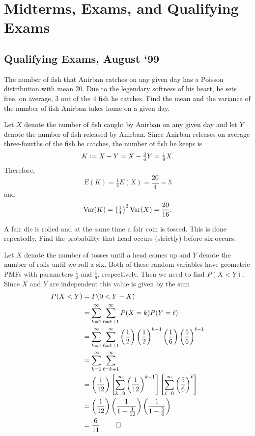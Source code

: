 \section{Midterms, Exams, and Qualifying Exams}
\subsection{Qualifying Exams, August `99}
\begin{problem}
  The number of fish that Anirban catches on any given day has a Poisson
  distribution with mean \(20\). Due to the legendary softness of his
  heart, he sets free, on average, \(3\) out of the \(4\) fish he
  catches. Find the mean and the variance of the number of fish Anirban
  takes home on a given day.
\end{problem}
\begin{solution*}
  Let \(X\) denote the number of fish caught by Anirban on any given day
  and let \(Y\) denote the number of fish released by Anirban. Since
  Anirban releases on average three-fourths of the fish he catches, the
  number of fish he keeps is
  \[
    K\defeq X-Y=X-\tfrac{3}{4}Y=\tfrac{1}{4}X.
  \]
  Therefore,
  \[
    E(K)=\tfrac{1}{4}E(X)=\frac{20}{4}=5
  \]
  and
  \[
    \operatorname{Var}(K)=\left(\tfrac{1}{4}\right)^2\operatorname{Var}(X)=\frac{20}{16}.
  \]
\end{solution*}

\begin{problem}
  A fair die is rolled and at the same time a fair coin is tossed. This is
  done repeatedly. Find the probability that head occurs (strictly) before
  six occurs.
\end{problem}
\begin{solution*}
  Let \(X\) denote the number of tosses until a head comes up and \(Y\)
  denote the number of rolls until we roll a six. Both of these random
  variables have geometric PMFs with parameters \(\frac{1}{2}\) and
  \(\frac{1}{6}\), respectively. Then we need to find \(P(X<Y)\). Since
  \(X\) and \(Y\) are independent this value is given by the sum
  \begin{align*}
    P(X<Y)
    &=P(0<Y-X)\\
    &=\sum_{k=1}^\infty\sum_{\ell=k+1}^\infty P(X=k)P(Y=\ell)\\
    &=\sum_{k=1}^\infty\sum_{\ell=k+1}^\infty
      \left(\frac{1}{2}\right)\left(\frac{1}{2}\right)^{k-1}
      \left(\frac{1}{6}\right)\left(\frac{5}{6}\right)^{\ell-1}\\
    &=\sum_{k=1}^\infty\sum_{\ell=k+1}^\infty\\
    &=\left(\frac{1}{12}\right)
     \left[\sum_{k=0}^\infty
      \left(\frac{1}{12}\right)^{k-1}
      \right]
      \left[\sum_{\ell=0}^\infty \left(\frac{5}{6}\right)^\ell\right]\\
    &=\left(\frac{1}{12}\right)
      \left(\frac{1}{1-\frac{1}{12}}\right)
      \left(\frac{1}{1-\frac{5}{6}}\right)\\
    &=\frac{6}{11}.\qedhere
  \end{align*}
\end{solution*}

